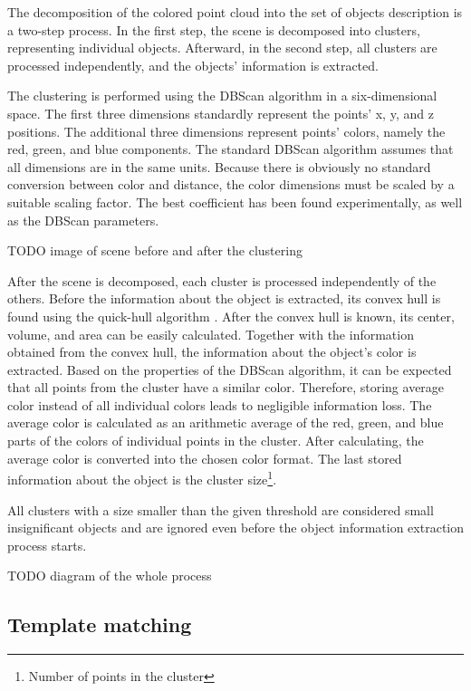The decomposition of the colored point cloud into the set of objects description is a two-step process. In the first step, the scene is decomposed into clusters, representing individual objects. Afterward, in the second step, all clusters are processed independently, and the objects' information is extracted.\par
The clustering is performed using the DBScan algorithm \cite{dbScan} in a six-dimensional space. The first three dimensions standardly represent the points' x, y, and z positions. The additional three dimensions represent points' colors, namely the red, green, and blue components. The standard DBScan algorithm assumes that all dimensions are in the same units. Because there is obviously no standard conversion between color and distance, the color dimensions must be scaled by a suitable scaling factor. The best coefficient has been found experimentally, as well as the DBScan parameters.\par

TODO image of scene before and after the clustering

After the scene is decomposed, each cluster is processed independently of the others. Before the information about the object is extracted,  its convex hull is found using the quick-hull algorithm \cite{quickhull}. After the convex hull is known, its center, volume, and area can be easily calculated. Together with the information obtained from the convex hull, the information about the object's color is extracted. Based on the properties of the DBScan algorithm, it can be expected that all points from the cluster have a similar color. Therefore, storing average color instead of all individual colors leads to negligible information loss. The average color is calculated as an arithmetic average of the red, green, and blue parts of the colors of individual points in the cluster. After calculating, the average color is converted into the chosen color format. The last stored information about the object is the cluster size\footnote{Number of points in the cluster}.\par
All clusters with a size smaller than the given threshold are considered small insignificant objects and are ignored even before the object information extraction process starts.

TODO diagram of the whole process

\subsection{Template matching}


